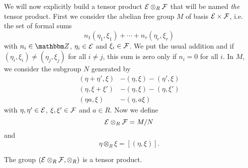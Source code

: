 We will now explicitly build a tensor product $\mathcal{E}\otimes_R\mathcal{F}$ that will be named \emph{the} tensor product. First we consider the abelian free group $M$ of basis $\mathcal{E}\times\mathcal{F}$, i.e. the set of formal sums
\[ 
  n_1(\eta_1,\xi_1)+\cdots+n_r(\eta_r,\xi_r)
\]
with $n_i\in\eZ$, $\eta_i\in\mathcal{E}$ and $\xi_i\in\mathcal{F}$. We put the usual addition and if $(\eta_i,\xi_i)\neq(\eta_j,\xi_j)$ for all $i\neq j$, this sum is zero only if $n_i=0$ for all $i$. In $M$, we consider the subgroup $N$ generated by
\begin{subequations}
\begin{align}
(\eta+\eta',\xi)&-(\eta,\xi)-(\eta',\xi)\\
(\eta,\xi+\xi')&-(\eta,\xi)-(\eta,\xi')\\
(\eta a,\xi)&-(\eta, a\xi)
\end{align}
\end{subequations}
with $\eta,\eta'\in\mathcal{E}$, $\xi,\xi'\in\mathcal{F}$ and $a\in R$. Now we define 
\begin{equation}
\mathcal{E}\otimes_R\mathcal{F}=M/N
\end{equation}
and 
\begin{equation}
\eta\otimes_R\xi=[(\eta,\xi)].
\end{equation}

\begin{proposition}
The group $(\mathcal{E}\otimes_R\mathcal{F},\otimes_R)$ is a tensor product.
\end{proposition}

